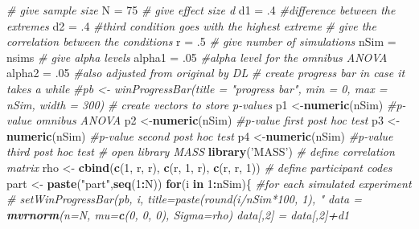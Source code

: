\documentclass[]{book}
\newenvironment{Shaded}{\begin{snugshade}}{\end{snugshade}}
\newcommand{\CommentTok}[1]{\textcolor[rgb]{0.56,0.35,0.01}{\textit{#1}}}
\newcommand{\ControlFlowTok}[1]{\textcolor[rgb]{0.13,0.29,0.53}{\textbf{#1}}}
\newcommand{\DataTypeTok}[1]{\textcolor[rgb]{0.13,0.29,0.53}{#1}}
\newcommand{\DecValTok}[1]{\textcolor[rgb]{0.00,0.00,0.81}{#1}}
\newcommand{\FloatTok}[1]{\textcolor[rgb]{0.00,0.00,0.81}{#1}}
\newcommand{\KeywordTok}[1]{\textcolor[rgb]{0.13,0.29,0.53}{\textbf{#1}}}
\newcommand{\NormalTok}[1]{#1}
\newcommand{\OperatorTok}[1]{\textcolor[rgb]{0.81,0.36,0.00}{\textbf{#1}}}
\newcommand{\StringTok}[1]{\textcolor[rgb]{0.31,0.60,0.02}{#1}}
\begin{document}
\begin{Shaded}
\begin{Highlighting}[]
\CommentTok{# give sample size}
\NormalTok{N =}\StringTok{ }\DecValTok{75}
\CommentTok{# give effect size d}
\NormalTok{d1 =}\StringTok{ }\FloatTok{.4} \CommentTok{#difference between the extremes}
\NormalTok{d2 =}\StringTok{ }\FloatTok{.4} \CommentTok{#third condition goes with the highest extreme}
\CommentTok{# give the correlation between the conditions}
\NormalTok{r =}\StringTok{ }\FloatTok{.5}
\CommentTok{# give number of simulations}
\NormalTok{nSim =}\StringTok{ }\NormalTok{nsims}
\CommentTok{# give alpha levels}
\NormalTok{alpha1 =}\StringTok{ }\FloatTok{.05} \CommentTok{#alpha level for the omnibus ANOVA}
\NormalTok{alpha2 =}\StringTok{ }\FloatTok{.05} \CommentTok{#also adjusted from original by DL}
\CommentTok{# create progress bar in case it takes a while}
\CommentTok{#pb <- winProgressBar(title = "progress bar", min = 0, max = nSim, width = 300)}
\CommentTok{# create vectors to store p-values}
\NormalTok{p1 <-}\KeywordTok{numeric}\NormalTok{(nSim) }\CommentTok{#p-value omnibus ANOVA}
\NormalTok{p2 <-}\KeywordTok{numeric}\NormalTok{(nSim) }\CommentTok{#p-value first post hoc test}
\NormalTok{p3 <-}\KeywordTok{numeric}\NormalTok{(nSim) }\CommentTok{#p-value second post hoc test}
\NormalTok{p4 <-}\KeywordTok{numeric}\NormalTok{(nSim) }\CommentTok{#p-value third post hoc test}
\CommentTok{# open library MASS}
\KeywordTok{library}\NormalTok{(}\StringTok{'MASS'}\NormalTok{)}
\CommentTok{# define correlation matrix}
\NormalTok{rho <-}\StringTok{ }\KeywordTok{cbind}\NormalTok{(}\KeywordTok{c}\NormalTok{(}\DecValTok{1}\NormalTok{, r, r), }\KeywordTok{c}\NormalTok{(r, }\DecValTok{1}\NormalTok{, r), }\KeywordTok{c}\NormalTok{(r, r, }\DecValTok{1}\NormalTok{))}
\CommentTok{# define participant codes}
\NormalTok{part <-}\StringTok{ }\KeywordTok{paste}\NormalTok{(}\StringTok{"part"}\NormalTok{,}\KeywordTok{seq}\NormalTok{(}\DecValTok{1}\OperatorTok{:}\NormalTok{N))}
\ControlFlowTok{for}\NormalTok{(i }\ControlFlowTok{in} \DecValTok{1}\OperatorTok{:}\NormalTok{nSim)\{ }\CommentTok{#for each simulated experiment}
 \CommentTok{# setWinProgressBar(pb, i, title=paste(round(i/nSim*100, 1), "%
\NormalTok{  data =}\StringTok{ }\KeywordTok{mvrnorm}\NormalTok{(}\DataTypeTok{n=}\NormalTok{N, }\DataTypeTok{mu=}\KeywordTok{c}\NormalTok{(}\DecValTok{0}\NormalTok{, }\DecValTok{0}\NormalTok{, }\DecValTok{0}\NormalTok{), }\DataTypeTok{Sigma=}\NormalTok{rho)}
\NormalTok{  data[,}\DecValTok{2}\NormalTok{] =}\StringTok{ }\NormalTok{data[,}\DecValTok{2}\NormalTok{]}\OperatorTok{+}\NormalTok{d1}
}
\end{Highlighting}
\end{Shaded}
\end{document}
